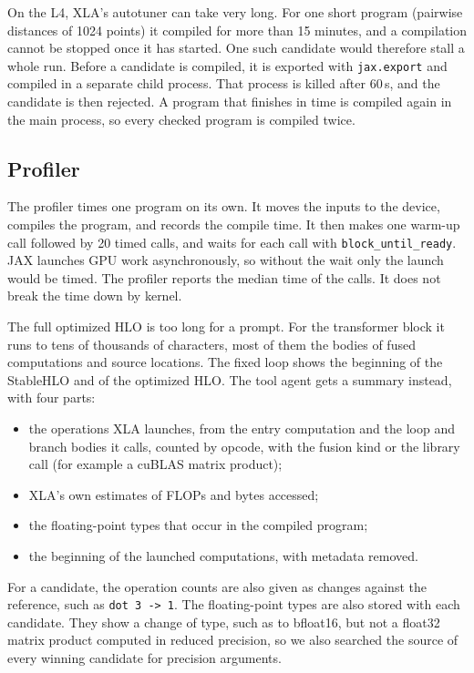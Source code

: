 \documentclass[conference]{IEEEtran}
\begin{document}
On the L4, XLA's autotuner can take very long. For one short program
(pairwise distances of 1024 points) it compiled for more than 15 minutes,
and a compilation cannot be stopped once it has started. One such candidate
would therefore stall a whole run. Before a candidate is compiled, it is
exported with \texttt{jax.export} and compiled in a separate child process.
That process is killed after 60\,s, and the candidate is then rejected. A
program that finishes in time is compiled again in the main process, so
every checked program is compiled twice.

\subsection{Profiler}
The profiler times one program on its own. It moves the inputs to the
device, compiles the program, and records the compile time. It then makes
one warm-up call followed by 20 timed calls, and waits for each call with
\texttt{block\_until\_ready}. JAX launches GPU work asynchronously, so
without the wait only the launch would be timed. The profiler reports the
median time of the calls. It does not break the time down by kernel.

The full optimized HLO is too long for a prompt. For the transformer block it
runs to tens of thousands of characters, most of them the bodies of fused
computations and source locations. The fixed loop shows the beginning
of the StableHLO and of the optimized HLO. The tool agent gets a
summary instead, with four parts:
\begin{itemize}
  \item the operations XLA launches, from the entry computation and the loop
    and branch bodies it calls, counted by opcode, with the fusion kind or
    the library call (for example a cuBLAS matrix product);
  \item XLA's own estimates of FLOPs and bytes accessed;
  \item the floating-point types that occur in the compiled program;
  \item the beginning of the launched computations, with metadata
    removed.
\end{itemize}
For a candidate, the operation counts are also given as changes against the
reference, such as \mbox{\texttt{dot 3 -> 1}}. The floating-point types are also
stored with each candidate. They show a change of type, such as to bfloat16,
but not a float32 matrix product computed in reduced precision, so we also
searched the source of every winning candidate for precision arguments.
\end{document}
